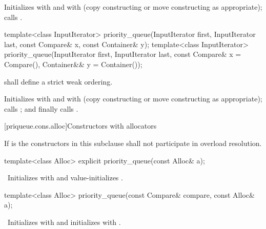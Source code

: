 \begin{codeblock}
\begin{codeblock}
\begin{itemdescr}
\pnum
\effects
Initializes
 with
 and
 with
 (copy constructing or move constructing as appropriate);
calls
.
\end{itemdescr}

%
\begin{itemdecl}
template<class InputIterator>
  priority_queue(InputIterator first, InputIterator last, const Compare& x, const Container& y);
template<class InputIterator>
  priority_queue(InputIterator first, InputIterator last, const Compare& x = Compare(),
                 Container&& y = Container());
\end{itemdecl}

\begin{itemdescr}
\pnum
\requires
{} shall define a strict weak ordering.

\pnum
\effects
Initializes
 with
 and
 with
 (copy constructing or move constructing as appropriate);
calls
;
and finally calls
.
\end{itemdescr}

[priqueue.cons.alloc]{Constructors with allocators}

\pnum
If  is 
the constructors in this subclause shall not participate in overload resolution.

%
\begin{itemdecl}
template<class Alloc> explicit priority_queue(const Alloc& a);
\end{itemdecl}

\begin{itemdescr}
\pnum
\effects\ Initializes  with  and value-initializes .
\end{itemdescr}

%
\begin{itemdecl}
template<class Alloc> priority_queue(const Compare& compare, const Alloc& a);
\end{itemdecl}

\begin{itemdescr}
\pnum
\effects\ Initializes  with  and initializes  with .
\end{itemdescr}


\end{codeblock}
\end{codeblock}
